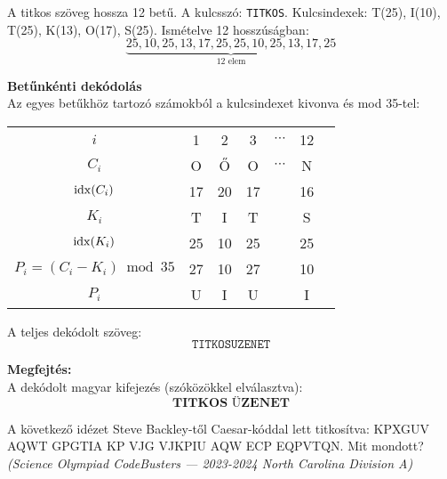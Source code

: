 \begin{solution}
A titkos szöveg hossza 12 betű. A kulcsszó: \texttt{TITKOS}. Kulcsindexek:
T(25), I(10), T(25), K(13), O(17), S(25). Ismételve 12 hosszúságban:
\[
\underbrace{25,10,25,13,17,25,25,10,25,13,17,25}_{\text{12 elem}}
\]

\textbf{Betűnkénti dekódolás}\\

Az egyes betűkhöz tartozó számokból a kulcsindexet kivonva és mod
35-tel:
\begin{center}
\begin{tabular}{ccccccc}
$i$ & 1 & 2 & 3 & $\cdots$ & 12 & \tabularnewline
$C_{i}$ & O & Ő & O & $\cdots$ & N & \tabularnewline
${\rm idx}(C_{i})$ & 17 & 20 & 17 &  & 16 & \tabularnewline
$K_{i}$ & T & I & T &  & S & \tabularnewline
${\rm idx}(K_{i})$ & 25 & 10 & 25 &  & 25 & \tabularnewline
$P_{i}=(C_{i}-K_{i})\bmod35$ & 27 & 10 & 27 &  & 10 & \tabularnewline
$P_{i}$ & U & I & U &  & I & \tabularnewline
\end{tabular}
\par\end{center}
A teljes dekódolt szöveg: 
\[
\texttt{TITKOSUZENET}
\]

\textbf{Megfejtés:}\\

A dekódolt magyar kifejezés (szóközökkel elválasztva): 
\[
\textbf{TITKOS ÜZENET}
\]
\end{solution}
\begin{extraproblem}
A következő idézet Steve Backley-től Caesar-kóddal lett titkosítva:
KPXGUV AQWT GPGTIA KP VJG VJKPIU AQW ECP EQPVTQN. Mit mondott? \emph{(Science
Olympiad CodeBusters --- 2023-2024 North Carolina Division A) }
\end{extraproblem}

